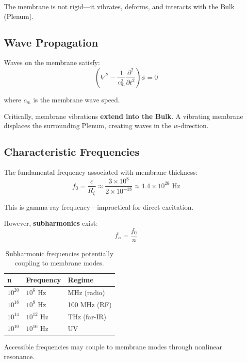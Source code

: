 \documentclass[12pt,a4paper]{article}
\begin{document}
The membrane is not rigid---it vibrates, deforms, and interacts with the Bulk (Plenum).

\subsection{Wave Propagation}

Waves on the membrane satisfy:
\begin{equation}
\left(\nabla^2 - \frac{1}{c_m^2}\frac{\partial^2}{\partial t^2}\right)\phi = 0
\end{equation}

where $c_m$ is the membrane wave speed.

Critically, membrane vibrations \textbf{extend into the Bulk}. A vibrating membrane displaces the surrounding Plenum, creating waves in the $w$-direction.

\subsection{Characteristic Frequencies}

The fundamental frequency associated with membrane thickness:
\begin{equation}
f_0 = \frac{c}{R_\xi} \approx \frac{3 \times 10^8}{2 \times 10^{-18}} \approx 1.4 \times 10^{26} \text{ Hz}
\end{equation}

This is gamma-ray frequency---impractical for direct excitation.

However, \textbf{subharmonics} exist:
\begin{equation}
f_n = \frac{f_0}{n}
\end{equation}

\begin{table}[H]
\centering
\begin{tabular}{@{}lll@{}}
\toprule
\textbf{n} & \textbf{Frequency} & \textbf{Regime} \\
\midrule
$10^{20}$ & $10^6$ Hz & MHz (radio) \\
$10^{18}$ & $10^8$ Hz & 100 MHz (RF) \\
$10^{14}$ & $10^{12}$ Hz & THz (far-IR) \\
$10^{10}$ & $10^{16}$ Hz & UV \\
\bottomrule
\end{tabular}
\caption{Subharmonic frequencies potentially coupling to membrane modes.}
\end{table}

Accessible frequencies may couple to membrane modes through nonlinear resonance.
\end{document}
